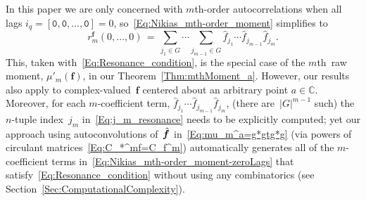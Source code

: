 \documentclass[letterpaper,11pt]{article}
\newcommand{\bs}[1]{{\boldsymbol{#1}}}
\newcommand{\gr}[1]{( #1 )}
\newcommand{\abs}[1]{\vert #1 \vert}
\newcommand{\vect}[1]{[ #1 ]}
\newcommand{\C}{\mathbb C}
\newcommand{\bcode}[1]{\texttt{#1}}
\newcommand{\hatbsf}{{\kern+0.25em}\hat{{\kern-0.25em}\bs{f}}}
\newcommand{\mth}{$m$th}
\theoremstyle{definition} \newtheorem{remark}{Remark}
\begin{document}
In this paper we are only concerned with \mth-order autocorrelations when all lags $i_q = \vect{\bcode{0},\bcode{0},\ldots,\bcode{0}} = 0$, so~\eqref{Eq:Nikias_mth-order_moment} simplifies to
\begin{equation} \label{Eq:Nikias_mth-order_moment-zeroLags}
r_m^\bs{f}\gr{0,\ldots,0} \,=\, \sum_{j_1\in G}\cdots\!\!\sum_{j_{m-1}\in G}
\hat{f}_{j_1}\cdots\hat{f}_{j_{m-1}}\hat{f}_{j_m}.
\end{equation}
This, taken with~\eqref{Eq:Resonance_condition}, is the special case of the \mth\ raw moment, $\mu'_m\gr{\bs{f}}$, in our Theorem~\ref{Thm:mthMoment_a}. However, our results also apply to complex-valued~$\bs{f}$ centered about an arbitrary point $a\in\C$. Moreover, for each $m$-coefficient term, $\hat{f}_{j_1}\cdots\hat{f}_{j_{m-1}}\hat{f}_{j_m}$, (there are~$\abs{G}^{m-1}$ such) the $n$-tuple index~$j_m$ in~\eqref{Eq:j_m_resonance} needs to be explicitly computed; yet our approach using autoconvolutions of~$\hatbsf$ in~\eqref{Eq:mu_m^a=g*gtg*g} (via powers of circulant matrices~\eqref{Eq:C_*^mf=C_f^m}) automatically generates all of the $m$-coefficient terms in~\eqref{Eq:Nikias_mth-order_moment-zeroLags} that satisfy~\eqref{Eq:Resonance_condition} without using any combinatorics (see Section~\ref{Sec:ComputationalComplexity}).




\end{document}
